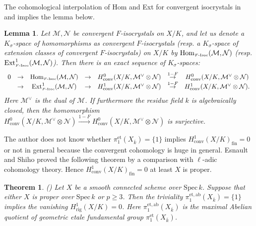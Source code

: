\documentclass[11pt]{amsart}
\newtheorem{theorem}[Lemma]{Theorem}
\newtheorem{lemma}[Lemma]{Lemma}
\begin{document}
\vspace*{3mm}

The cohomological interpolation of Hom and Ext for convergent isocrystals 
in \cite[Proposition 2.2.7]{Be} and \cite[Proposition 1.2.2]{CL} implies the lemma below. 

\begin{lemma}\label{ext} Let $\mathcal M, \mathcal N$ be convergent 
$F$-isocrystals on $X/K$, and let us denote a $K_\sigma$-space of 
homomorphisms as convergent 
$F$-isocrystals (resp. a $K_\sigma$-space of extension classes of convergent $F$-isocrystals) 
on $X/K$ by 
$\mathrm{Hom}_{\tiny \mbox{\rm $F$-Isoc}}(\mathcal M, \mathcal N)$ 
(resp. $\mathrm{Ext}^1_{\tiny \mbox{\rm $F$-Isoc}}(\mathcal M, \mathcal N)$). Then there is 
an exact sequence of $K_\sigma$-spaces:
$$
  \begin{array}{ccccccc}
  0 &\rightarrow &\mathrm{Hom}_{\tiny \mbox{\rm $F$-Isoc}}(\mathcal M, \mathcal N) &\rightarrow 
  &H^0_{\mathrm{conv}}(X/K, \mathcal M^\vee \otimes\mathcal N) 
  &\overset{1-F}{\rightarrow} &H^0_{\mathrm{conv}}(X/K, \mathcal M^\vee \otimes\mathcal N) \\
   &\rightarrow &\mathrm{Ext}^1_{\tiny \mbox{\rm $F$-Isoc}}(\mathcal M, \mathcal N) &\rightarrow 
  &H^1_{\mathrm{conv}}(X/K, \mathcal M^\vee \otimes\mathcal N) &\overset{1-F}{\rightarrow} 
  &H^1_{\mathrm{conv}}(X/K, \mathcal M^\vee \otimes\mathcal N). 
  \end{array}
$$
Here $\mathcal M^\vee$ is the dual of $\mathcal M$. 
If furthermore the residue field $k$ is algebraically closed, then 
the homomorphism $H^0_{\mathrm{conv}}(X/K, \mathcal M^\vee \otimes\mathcal N) 
\overset{1-F}{\rightarrow} H^0_{\mathrm{conv}}(X/K, \mathcal M^\vee \otimes\mathcal N)$ 
is surjective. 
\end{lemma}

\vspace*{3mm}

The author does not know whether $\pi_1^{\mathrm{et}}(X_{\overline{k}}) = \{ 1 \}$
implies $H^1_{\mathrm{conv}}(X/K)_{\mathrm{fin}} = 0$ or not in general because 
the convergent cohomology is huge in general. 
Esnault and Shiho proved the following theorem by a comparison with $\ell$-adic cohomology theory. 
Hence $H^1_{\mathrm{conv}}(X/K)_{\mathrm{fin}} = 0$ at least $X$ is proper. 

\begin{theorem}\label{vann} \mbox{\rm (\cite[Theorem 5.1]{ES2})}  
Let $X$ be a smooth connected scheme over $\mathrm{Spec}\, k$. 
Suppose that either $X$ is proper over $\mathrm{Spec}\, k$ or $p \geq 3$.  
Then the triviality $\pi_1^{\mathrm{et, ab}}(X_{\overline{k}}) = \{ 1 \}$ implies the vanishing 
$H^1_{\mathrm{rig}}(X/K) = 0$. Here $\pi_1^{\mathrm{et, ab}}(X_{\overline{k}})$ is the maximal Abelian quotient 
of geometric etale fundamental group $\pi_1^{\mathrm{et}}(X_{\overline{k}})$. 
\end{theorem}
\end{document}
